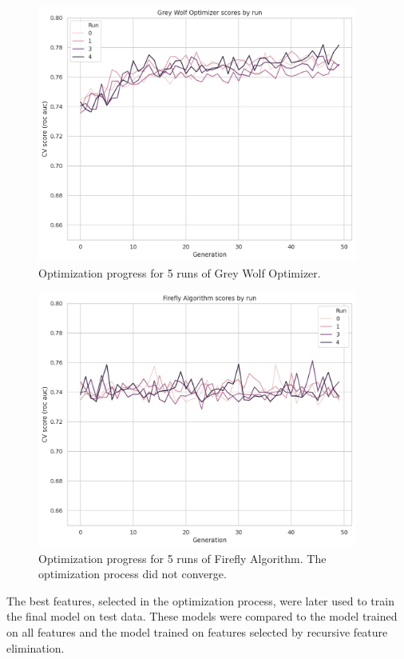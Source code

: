\documentclass[runningheads]{llncs}
\begin{document}

\begin{figure}[htp]
	\centering
	\includegraphics[clip, width=10.5cm]{figures/gwo_scores_by_run}
    \caption{Optimization progress for 5 runs of Grey Wolf Optimizer.}
    \label{fig:nia_scores_by_run_1}
\end{figure}

\begin{figure}[htp]
	\centering
	\includegraphics[clip, width=10.5cm]{figures/fa_scores_by_run}
    \caption{Optimization progress for 5 runs of Firefly Algorithm. The optimization process did not converge.}
    \label{fig:nia_scores_by_run_2}
\end{figure}

The best features, selected in the optimization process, were later used to train the final model on test data. These models were compared to the model trained on all features and the model trained on features selected by recursive feature elimination.
\end{document}
